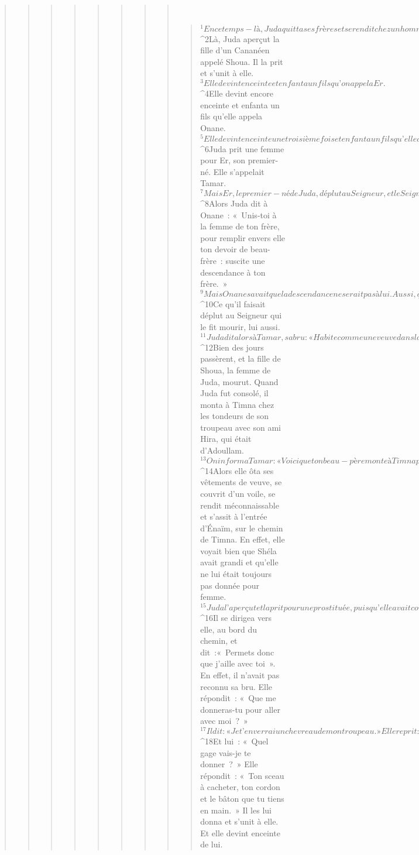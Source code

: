 \begin{verse}
\begin{verse}
\begin{verse}
\begin{verse}
\begin{verse}
\begin{verse}
\begin{verse}
\begin{verse}
         
      \bchapter{}
      \begin{verse}
${}^{1}En ce temps-là, Juda quitta ses frères et se rendit chez un homme d’Adoullam appelé Hira. 
${}^{2}Là, Juda aperçut la fille d’un Cananéen appelé Shoua. Il la prit et s’unit à elle. 
${}^{3}Elle devint enceinte et enfanta un fils qu’on appela Er. 
${}^{4}Elle devint encore enceinte et enfanta un fils qu’elle appela Onane. 
${}^{5}Elle devint enceinte une troisième fois et enfanta un fils qu’elle appela Shéla. Juda était à Késib lors de cette naissance.
${}^{6}Juda prit une femme pour Er, son premier-né. Elle s’appelait Tamar. 
${}^{7}Mais Er, le premier-né de Juda, déplut au Seigneur, et le Seigneur le fit mourir. 
${}^{8}Alors Juda dit à Onane : « Unis-toi à la femme de ton frère, pour remplir envers elle ton devoir de beau-frère : suscite une descendance à ton frère. » 
${}^{9}Mais Onane savait que la descendance ne serait pas à lui. Aussi, quand il s’unissait à la femme de son frère, il laissait la semence se perdre à terre, pour ne pas donner de descendance à son frère. 
${}^{10}Ce qu’il faisait déplut au Seigneur qui le fit mourir, lui aussi. 
${}^{11}Juda dit alors à Tamar, sa bru : « Habite comme une veuve dans la maison de ton père, jusqu’à ce que mon fils Shéla ait grandi. » Il se disait, en effet : « Il ne faudrait pas que celui-ci meure aussi, comme ses frères. » Tamar s’en alla donc habiter dans la maison de son père.
${}^{12}Bien des jours passèrent, et la fille de Shoua, la femme de Juda, mourut. Quand Juda fut consolé, il monta à Timna chez les tondeurs de son troupeau avec son ami Hira, qui était d’Adoullam. 
${}^{13}On informa Tamar : « Voici que ton beau-père monte à Timna pour la tonte de son troupeau. » 
${}^{14}Alors elle ôta ses vêtements de veuve, se couvrit d’un voile, se rendit méconnaissable et s’assit à l’entrée d’Énaïm, sur le chemin de Timna. En effet, elle voyait bien que Shéla avait grandi et qu’elle ne lui était toujours pas donnée pour femme.
${}^{15}Juda l’aperçut et la prit pour une prostituée, puisqu’elle avait couvert son visage. 
${}^{16}Il se dirigea vers elle, au bord du chemin, et dit :« Permets donc que j’aille avec toi ». En effet, il n’avait pas reconnu sa bru. Elle répondit : « Que me donneras-tu pour aller avec moi ? » 
${}^{17}Il dit : « Je t’enverrai un chevreau de mon troupeau. » Elle reprit : « Oui, si tu me donnes un gage jusqu’à ce que tu l’envoies. » 
${}^{18}Et lui : « Quel gage vais-je te donner ? » Elle répondit : « Ton sceau à cacheter, ton cordon et le bâton que tu tiens en main. » Il les lui donna et s’unit à elle. Et elle devint enceinte de lui. 

\end{verse}
\end{verse}
\end{verse}
\end{verse}
\end{verse}
\end{verse}
\end{verse}
\end{verse}
\end{verse}
